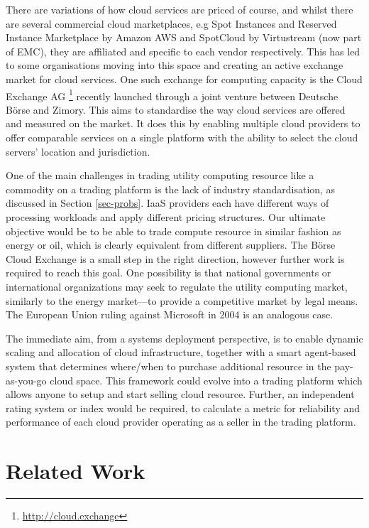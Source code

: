 \documentclass[conference,10pt]{IEEEtran}
\begin{document}
There are variations of how cloud services are priced of course, and whilst there are several commercial cloud marketplaces, e.g Spot Instances and Reserved Instance Marketplace by Amazon AWS and SpotCloud by Virtustream (now part of EMC), they are affiliated and specific to each vendor respectively. 
This has led to some organisations moving into this space and creating an active exchange market for cloud services. One such exchange for computing capacity is the Cloud Exchange AG \footnote{\url{http://cloud.exchange}} recently launched through a joint venture between Deutsche B\"{o}rse and Zimory.  This aims to standardise the way cloud services are offered and measured on the market. It does this by enabling multiple cloud providers to offer comparable services on a single platform with the ability to select the cloud servers' location and jurisdiction.

One of the main challenges in trading utility computing resource like a commodity on a trading platform is the lack of industry standardisation, as discussed in Section \ref{sec-probs}.
IaaS providers each have different ways of processing workloads and apply different pricing structures. Our ultimate objective would be to be able to trade compute resource in similar fashion as energy or oil, which is clearly equivalent from different suppliers.
The B\"{o}rse Cloud Exchange is a small step in the right direction, however further work is required to reach this goal. One possibility is that national governments or international organizations may seek to regulate the utility computing market, similarly to the energy market---to provide a competitive market by legal means. The European Union ruling against Microsoft in 2004 is an analogous case.


The immediate aim, from a systems deployment perspective, is to enable
dynamic scaling and allocation of cloud infrastructure, together with a smart agent-based system that determines where/when to purchase  additional resource 
in the pay-as-you-go cloud space. 
This framework could evolve into 
a trading platform which allows anyone to setup and start selling cloud resource. Further, an independent rating system or index would be required, to calculate a metric for reliability and performance of each cloud provider operating as a seller in the trading platform.


\section{Related Work}
\label{sec-relw}
\end{document}
